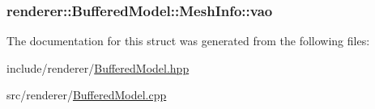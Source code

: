 \hypertarget{structrenderer_1_1BufferedModel_1_1MeshInfo_a4bda08976af2f4d2e9c06f0aab773b01}{
\subsubsection[{vao}]{ renderer\-::\-Buffered\-Model\-::\-Mesh\-Info\-::vao}}\label{structrenderer_1_1BufferedModel_1_1MeshInfo_a4bda08976af2f4d2e9c06f0aab773b01}


The documentation for this struct was generated from the following files\-:\begin{DoxyCompactItemize}
\item 
include/renderer/\hyperlink{BufferedModel_8hpp}{Buffered\-Model.\-hpp}\item 
src/renderer/\hyperlink{BufferedModel_8cpp}{Buffered\-Model.\-cpp}\end{DoxyCompactItemize}
